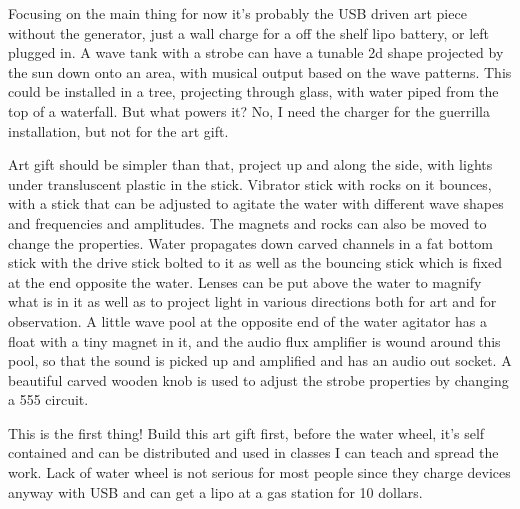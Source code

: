 Focusing on the main thing for now it's probably the USB driven art
piece without the generator, just a wall charge for a off the shelf lipo
battery, or left plugged in. A wave tank with a strobe can have a
tunable 2d shape projected by the sun down onto an area, with musical
output based on the wave patterns. This could be installed in a tree,
projecting through glass, with water piped from the top of a waterfall.
But what powers it? No, I need the charger for the guerrilla
installation, but not for the art gift.

Art gift should be simpler than that, project up and along the side,
with lights under transluscent plastic in the stick. Vibrator stick with
rocks on it bounces, with a stick that can be adjusted to agitate the
water with different wave shapes and frequencies and amplitudes. The
magnets and rocks can also be moved to change the properties. Water
propagates down carved channels in a fat bottom stick with the drive
stick bolted to it as well as the bouncing stick which is fixed at the
end opposite the water. Lenses can be put above the water to magnify
what is in it as well as to project light in various directions both for
art and for observation. A little wave pool at the opposite end of the
water agitator has a float with a tiny magnet in it, and the audio flux
amplifier is wound around this pool, so that the sound is picked up and
amplified and has an audio out socket. A beautiful carved wooden knob is
used to adjust the strobe properties by changing a 555 circuit.

This is the first thing! Build this art gift first, before the water
wheel, it's self contained and can be distributed and used in classes I
can teach and spread the work. Lack of water wheel is not serious for
most people since they charge devices anyway with USB and can get a lipo
at a gas station for 10 dollars.
